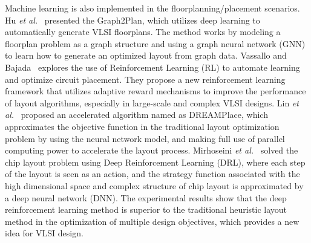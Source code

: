  Machine learning is also implemented in the floorplanning/placement scenarios. Hu \emph{et al.}~\cite{hu2020graph2plan} presented the Graph2Plan, which utilizes deep learning to automatically generate VLSI floorplans. The method works by modeling a floorplan problem as a graph structure and using a graph neural network (GNN) to learn how to generate an optimized layout from graph data. Vassallo and Bajada~\cite{10546526} explores the use of Reinforcement Learning (RL) to automate learning and optimize circuit placement. They propose a new reinforcement learning framework that utilizes adaptive reward mechanisms to improve the performance of layout algorithms, especially in large-scale and complex VLSI designs. Lin \emph{et al.}~\cite{10.1145/3316781.3317803} proposed an accelerated algorithm named as  DREAMPlace, which approximates the objective function in the traditional layout optimization problem by using the neural network model, and making full use of parallel computing power to accelerate the layout process. Mirhoseini \emph{et al.}~\cite{mirhoseini2020chip} solved the chip layout problem using Deep Reinforcement Learning (DRL), where each step of the layout is seen as an action, and the strategy function associated with the high dimensional space and complex structure of chip layout is approximated by a deep neural network (DNN). The experimental results show that the deep reinforcement learning method is superior to the traditional heuristic layout method in the optimization of multiple design objectives, which provides a new idea for VLSI design.




